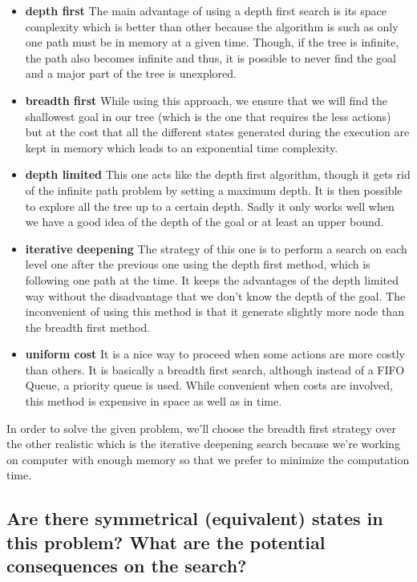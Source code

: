 \documentclass[a4paper,10pt]{article}
\begin{document}
	\begin{itemize}
		\item \textbf{depth first} The main advantage of using a depth first search is its space complexity which is better than other because the algorithm is such as only one path must be in memory at a given time. 
		Though, if the tree is infinite, the path also becomes infinite and thus, it is possible to never find the goal and a major part of the tree is unexplored.
		\item \textbf{breadth first} While using this approach, we ensure that we will find the shallowest goal in our tree (which is the one that requires the less actions) but at the cost that all the different states generated during the execution are kept in memory which leads to an exponential time complexity.
		\item \textbf{depth limited} This one acts like the depth first algorithm, though it gets rid of the infinite path problem by setting a maximum depth. It is then possible to explore all the tree up to a certain depth. 
		Sadly it only works well when we have a good idea of the depth of the goal or at least an upper bound.
		\item \textbf{iterative deepening} The strategy of this one is to perform a search on each level one after the previous one using the depth first method, which is following one path at the time. It keeps the advantages of the depth limited way without the disadvantage that we don't know the depth of the goal.
		The inconvenient of using this method is that it generate slightly more node than the breadth first method.
		\item \textbf{uniform cost} It is a nice way to proceed when some actions are more costly than others. It is basically a breadth first search, although instead of a FIFO Queue, a priority queue is used.
		While convenient when costs are involved, this method is expensive in space as well as in time.
	\end{itemize}
	In order to solve the given problem, we'll choose the breadth first strategy over the other realistic which is the iterative deepening search because we're working on computer with enough memory so that we prefer to minimize the computation time.
	
	\subsection{Are there symmetrical (equivalent) states in this problem? What are the potential consequences on the search?}
	
\end{document}
